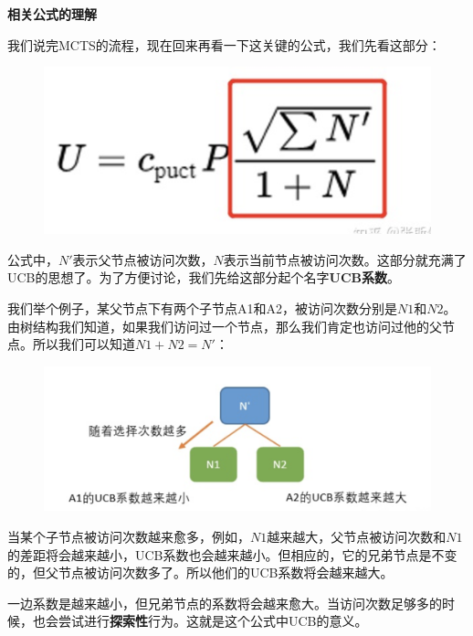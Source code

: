 \documentclass[12pt]{article}
\begin{document}
\begin{framed}
\textbf{相关公式的理解}

我们说完MCTS的流程，现在回来再看一下这关键的公式，我们先看这部分：
\begin{figure}[H]
    \centering
    \includegraphics[width=.2\textwidth]{fig/ReinforcementLearning/AlphaZero_MCTS_Eq_1.png}
\end{figure}

公式中，$N'$表示父节点被访问次数，$N$表示当前节点被访问次数。这部分就充满了UCB的思想了。为了方便讨论，我们先给这部分起个名字\textbf{UCB系数}。

我们举个例子，某父节点下有两个子节点A1和A2，被访问次数分别是$N1$和$N2$。由树结构我们知道，如果我们访问过一个节点，那么我们肯定也访问过他的父节点。所以我们可以知道$N1 + N2 = N'$：
\begin{figure}[H]
    \centering
    \includegraphics[width=.8\textwidth]{fig/ReinforcementLearning/AlphaZero_MCTS_Eq_2.png}
\end{figure}

当某个子节点被访问次数越来愈多，例如，$N1$越来越大，父节点被访问次数和$N1$的差距将会越来越小，UCB系数也会越来越小。但相应的，它的兄弟节点是不变的，但父节点被访问次数多了。所以他们的UCB系数将会越来越大。

一边系数是越来越小，但兄弟节点的系数将会越来愈大。当访问次数足够多的时候，也会尝试进行\textbf{探索性}行为。这就是这个公式中UCB的意义。
\end{framed}
\end{document}
